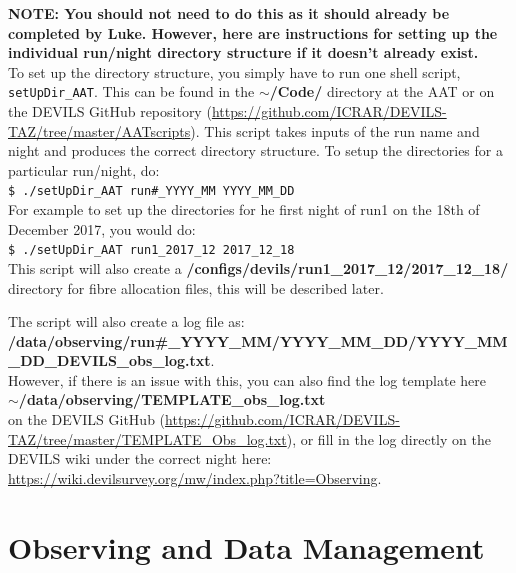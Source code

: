 \documentclass[12pt]{article}
\begin{document}
\textcolor{PineGreen}{\textbf{NOTE: You should not need to do this as it should already be completed by Luke. However, here are instructions for setting up the individual run/night directory structure if it doesn't already exist.}} \\

To set up the directory structure, you simply have to run one shell script, \texttt{setUpDir\_AAT}. This can be found in the \textbf{$\sim$/Code/} directory at the AAT or on the DEVILS GitHub repository (\url{https://github.com/ICRAR/DEVILS-TAZ/tree/master/AATscripts}). This script  takes inputs of the run name and night and produces the correct directory structure. To setup the directories for a particular run/night, do:\\

\hspace{10mm} \texttt{\$ ./setUpDir\_AAT run\#\_YYYY\_MM YYYY\_MM\_DD} \\

For example to set up the directories for he first night of run1 on the 18th of December 2017, you would do: \\

\hspace{10mm} \texttt{\$ ./setUpDir\_AAT run1\_2017\_12 2017\_12\_18} \\
 
This script will also create a \textbf{/configs/devils/run1\_2017\_12/2017\_12\_18/} directory for fibre allocation files, this will be described later. 

The script will also create a log file as: \\

\textbf{/data/observing/run\#\_YYYY\_MM/YYYY\_MM\_DD/YYYY\_MM\_DD\_DEVILS\_obs\_log.txt}. \\

However, if there is an issue with this, you can also find the log template here\\

 \textbf{$\sim$/data/observing/TEMPLATE\_obs\_log.txt} \\
 
on the DEVILS GitHub (\url{https://github.com/ICRAR/DEVILS-TAZ/tree/master/TEMPLATE\_Obs\_log.txt}), or fill in the log directly on the DEVILS wiki under the correct night here: \url{https://wiki.devilsurvey.org/mw/index.php?title=Observing}.   




\section{Observing and Data Management}
\end{document}

